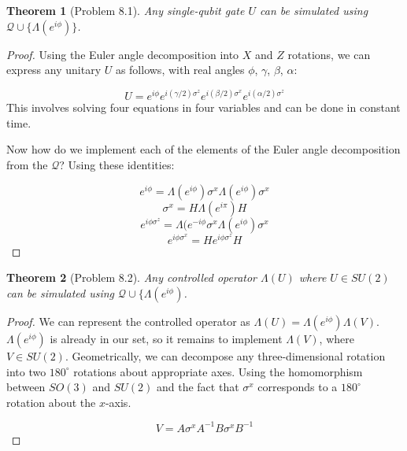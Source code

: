 \documentclass{article}
\theoremstyle{plain}
\newtheorem{theorem}{Theorem}
\begin{document}
\begin{theorem}[Problem 8.1]
Any single-qubit gate $U$ can be simulated using $\mathcal{Q} \cup \{ \Lambda(e^{i\phi}) \}$.
\end{theorem}

\begin{proof}
Using the Euler angle decomposition into $X$ and $Z$ rotations, we can express any
unitary $U$ as follows, with real angles $\phi$, $\gamma$, $\beta$, $\alpha$:

\begin{equation}
U = e^{i\phi}e^{i(\gamma/2)\sigma^z}e^{i(\beta/2)\sigma^x}e^{i(\alpha/2)\sigma^z}
\end{equation}
This involves solving four equations in four variables and can be done in constant time.

Now how do we implement each of the elements of the Euler angle decomposition from
the $\mathcal{Q}$? Using these identities:

\begin{equation}
e^{i\phi} = \Lambda(e^{i\phi})\sigma^x\Lambda(e^{i\phi})\sigma^x
\end{equation}
\begin{equation}
\sigma^x = H\Lambda(e^{i\pi})H
\end{equation}
\begin{equation}
e^{i\phi\sigma^z} = \Lambda(e^{-i\phi}\sigma^x\Lambda(e^{i\phi})\sigma^x
\end{equation}
\begin{equation}
e^{i\phi\sigma^x} = H e^{i\phi\sigma^z} H
\end{equation}
\end{proof}

\begin{theorem}[Problem 8.2]
Any controlled operator $\Lambda(U)$ where $U \in SU(2)$ can be simulated using
$\mathcal{Q} \cup \{ \Lambda(e^{i\phi})$.
\end{theorem}

\begin{proof}
We can represent the controlled operator as $\Lambda(U) = \Lambda(e^{i\phi})\Lambda(V)$.
$\Lambda(e^{i\phi})$ is already in our set, so it remains to implement
$\Lambda(V)$, where $V \in SU(2)$. Geometrically, we can decompose any
three-dimensional rotation into two $180^{\circ}$ rotations about appropriate
axes. Using the homomorphism between $SO(3)$ and $SU(2)$ and the fact that
$\sigma^x$ corresponds to a $180^{\circ}$ rotation about the $x$-axis.

\begin{equation}
V = A\sigma^x A^{-1} B\sigma^x B^{-1}
\end{equation}
\end{proof}
\end{document}
